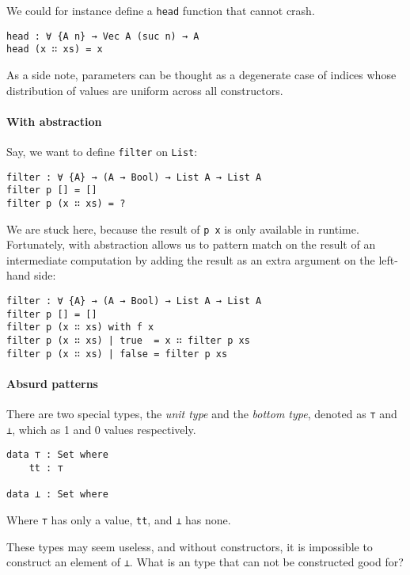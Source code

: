 \documentclass[12pt, a4paper]{article}
\begin{document}
We could for instance define a {\lstinline|head|} function that cannot crash.

\begin{lstlisting}
head : ∀ {A n} → Vec A (suc n) → A
head (x ∷ xs) = x
\end{lstlisting}

As a side note, parameters can be thought as a degenerate case of indices whose
distribution of values are uniform across all constructors.

\paragraph{With abstraction}

Say, we want to define {\lstinline|filter|} on {\lstinline|List|}:

\begin{lstlisting}
filter : ∀ {A} → (A → Bool) → List A → List A
filter p [] = []
filter p (x ∷ xs) = ?
\end{lstlisting}

We are stuck here, because the result of {\lstinline|p x|} is only available in
runtime. Fortunately, with abstraction allows us to pattern match on the result
of an intermediate computation by adding the result as an extra argument on the
left-hand side:

\begin{lstlisting}
filter : ∀ {A} → (A → Bool) → List A → List A
filter p [] = []
filter p (x ∷ xs) with f x
filter p (x ∷ xs) | true  = x ∷ filter p xs
filter p (x ∷ xs) | false = filter p xs
\end{lstlisting}

\paragraph{Absurd patterns}

There are two special types, the \textit{unit type} and the \textit{bottom type},
denoted as {\lstinline|⊤|} and {\lstinline|⊥|}, which as 1 and 0 values respectively.

\begin{lstlisting}
data ⊤ : Set where
    tt : ⊤

data ⊥ : Set where
\end{lstlisting}

Where {\lstinline|⊤|} has only a value, {\lstinline|tt|}, and {\lstinline|⊥|} has none.

These types may seem useless, and without constructors, it is impossible to
construct an element of {\lstinline|⊥|}. What is an type that can not be
constructed good for?
\end{document}
